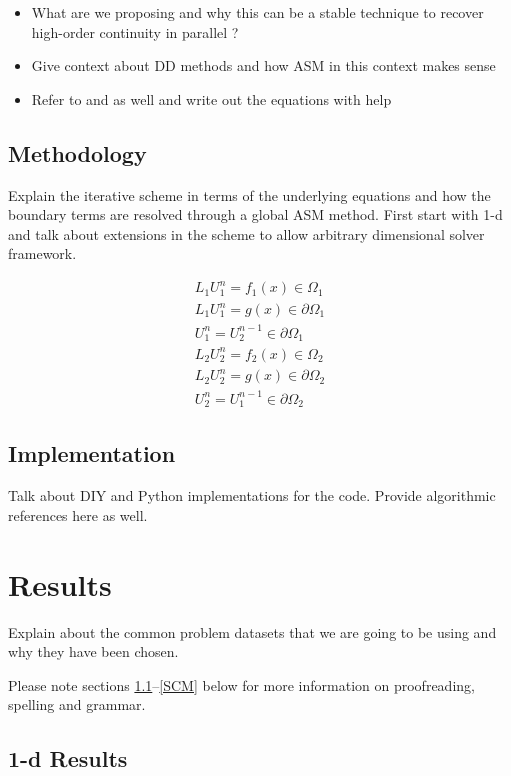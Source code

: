 \documentclass[conference]{IEEEtran}
\begin{document}
\begin{itemize}
	\item What are we proposing and why this can be a stable technique to recover high-order continuity in parallel ?
	\item Give context about DD methods and how ASM in this context makes sense 
	\item Refer to \cite{smith-ddm} and \cite{ddm-rbf-fast} as well and write out the equations with \cite{nurbs-book} help
\end{itemize}

\subsection{Methodology}

Explain the iterative scheme in terms of the underlying equations and how the boundary terms are resolved through a global ASM method. First start with 1-d and talk about extensions in the scheme to allow arbitrary dimensional solver framework.

\begin{eqnarray} \label{asm}
L_1U^{n}_1=f_1(x) \in \Omega_1  \\
L_1U^{n}_1=g(x) \in \partial\Omega_1 \\ 
U^{n}_1 = U^{n-1}_2 \in \partial\Omega_1 \\
L_2U^{n}_2=f_2(x) \in \Omega_2 \\
L_2U^{n}_2=g(x) \in \partial\Omega_2 \\
U^{n}_2 = U^{n-1}_1 \in \partial\Omega_2
\end{eqnarray}


\subsection{Implementation}

Talk about DIY and Python implementations for the code. Provide algorithmic references here as well.

\section{Results}

Explain about the common problem datasets that we are going to be using and why they have been chosen.

Please note sections \ref{AA}--\ref{SCM} below for more information on 
proofreading, spelling and grammar.

\subsection{1-d Results}\label{AA}
\end{document}
